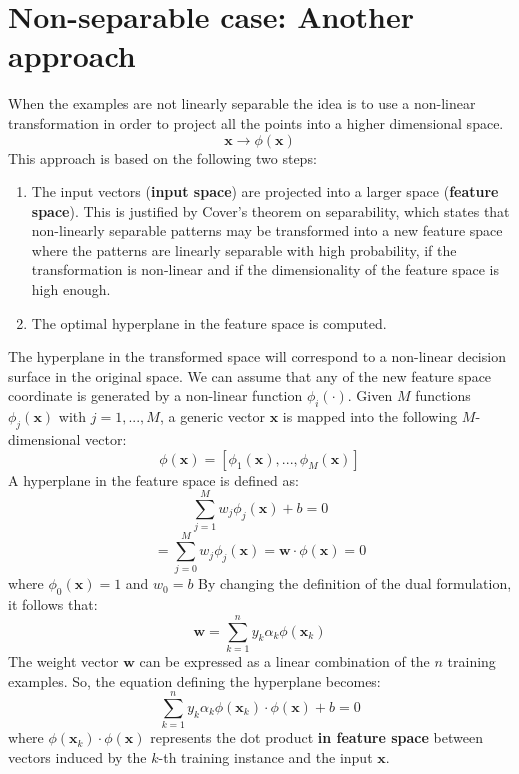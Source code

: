 \section{Non-separable case: Another approach}
When the examples are not linearly separable the idea is to use a non-linear transformation in order to project all the points into a higher dimensional space.
\[\textbf{x} \rightarrow \phi(\textbf{x})\]
This approach is based on the following two steps:
\begin{enumerate}
    \item The input vectors (\textbf{input space}) are projected into a larger space (\textbf{feature space}). This is justified by Cover's theorem on separability, which states that non-linearly separable patterns may be transformed into a new feature space where the patterns are linearly separable with high probability, if the transformation is non-linear and if the dimensionality of the feature space is high enough.

    \item The optimal hyperplane in the feature space is computed.
\end{enumerate}
The hyperplane in the transformed space will correspond to a non-linear decision surface in the original space.\newline\newline
We can assume that any of the new feature space coordinate is generated by a non-linear function $\phi_{i}(\cdot)$. Given $M$ functions $\phi_{j}(\textbf{x})$ with $j = 1,...,M$, a generic vector $\textbf{x}$ is mapped into the following $M$-dimensional vector:
\[\phi(\textbf{x}) = [\phi_{1}(\textbf{x}),...,\phi_{M}(\textbf{x})]\]
A hyperplane in the feature space is defined as:
\[\sum_{j=1}^{M}w_{j}\phi_{j}(\textbf{x}) + b = 0\]
\[= \sum_{j = 0}^{M}w_{j}\phi_{j}(\textbf{x}) = \textbf{w} \cdot \phi(\textbf{x}) = 0\]
where $\phi_{0}(\textbf{x}) = 1$ and $w_{0} = b$\newline\newline
By changing the definition of the dual formulation, it follows that:
\[\textbf{w} = \sum_{k = 1}^{n}y_{k}\alpha_{k}\phi(\textbf{x}_{k})\]
The weight vector $\textbf{w}$ can be expressed as a linear combination of the $n$ training examples. So, the equation defining the hyperplane becomes:
\[\sum_{k = 1}^{n}y_{k}\alpha_{k}\phi(\textbf{x}_{k}) \cdot \phi(\textbf{x}) + b = 0\]
where $\phi(\textbf{x}_{k}) \cdot \phi(\textbf{x})$ represents the dot product \textbf{in feature space} between vectors induced by the $k$-th training instance and the input $\textbf{x}$.
